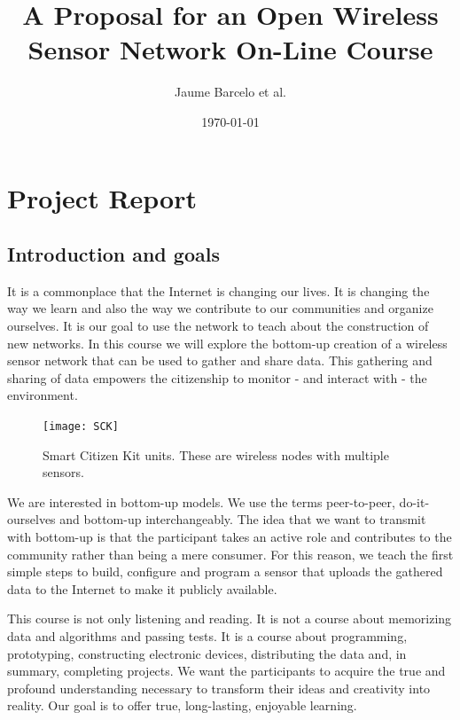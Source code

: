 \documentclass[a4paper,oneside]{book}   %
\begin{document}
\title{A Proposal for an  Open Wireless Sensor Network On-Line Course} %
\author{Jaume Barcelo et al.} %
\date{\today}    %

\maketitle %
\tableofcontents

\chapter{Project Report}
\section{Introduction and goals} %

It is a commonplace that the Internet is changing our lives.
It is changing the way we learn and also the way we contribute to our communities and organize ourselves.
It is our goal to use the network to teach about the construction of new networks.
In this course we will explore the bottom-up creation of a wireless sensor network that can be used to gather and share data.
This gathering and sharing of data empowers the citizenship to monitor - and interact with - the environment.

\begin{figure}
\begin{center}
\texttt{[image: SCK]}
\caption{Smart Citizen Kit units. These are wireless nodes with multiple sensors.}
\label{fig:SCK}
\end{center}
\end{figure}

We are interested in bottom-up models.
We use the terms peer-to-peer, do-it-ourselves and bottom-up interchangeably.
The idea that we want to transmit with bottom-up is that the participant takes an active role and contributes to the community rather than being a mere consumer.
For this reason, we teach the first simple steps to build, configure and program a sensor that uploads the gathered data to the Internet to make it publicly available.

This course is not only listening and reading. 
It is not a course about memorizing data and algorithms and passing tests.
It is a course about programming, prototyping, constructing electronic devices, distributing the data and, in summary, completing projects.
We want the participants to acquire the true and profound understanding necessary to transform their ideas and creativity into reality.
Our goal is to offer true, long-lasting, enjoyable learning.
\end{document}
